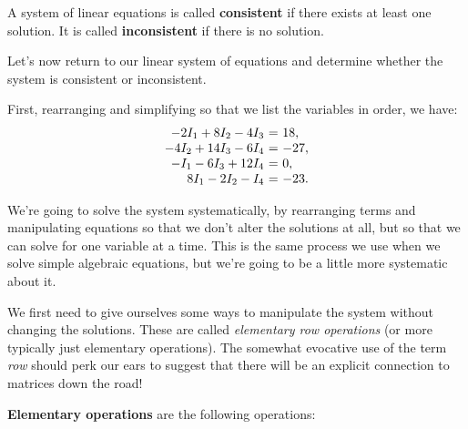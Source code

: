 \documentclass{ximera}
\begin{document}
\begin{example}
\begin{definition}
      A system of linear equations is called \textbf{consistent}%
       if there exists at
      least one solution. It is called \textbf{inconsistent}%
       if there is no
      solution.
    \end{definition}



\begin{solution}
  
  Let's now return to our linear system of equations and determine whether the system is consistent or inconsistent.

  First, rearranging and simplifying so that we list the variables in order, we have:
  \begin{equation*}
    \begin{array}{r@{~}c@{~}l}
      -2I_1+8I_2-4I_3&=&18, \\
      - 4I_2 + 14I_3 - 6I_4 &=& -27, \\
      -I_1 - 6I_3 + 12I_4 &=& 0, \\
      8I_1-2I_2 - I_4 &=& -23.
    \end{array}
  \end{equation*}

  We're going to solve the system systematically, by rearranging terms and manipulating equations so that we don't alter the solutions at all, but so that we can solve for one variable at a time. This is the same process we use when we solve simple algebraic equations, but we're going to be a little more systematic about it.

  \begin{remark}

  We first need to give ourselves some ways to manipulate the system without changing the solutions. These are called \emph{elementary row operations} (or more typically just elementary operations). The somewhat evocative use of the term \emph{row} should perk our ears to suggest that there will be an explicit connection to matrices down the road!

\end{remark}

  \begin{definition}
    
    \textbf{Elementary operations}%
     are the
    following operations:
  

\end{definition}
\end{solution}
\end{example}
\end{document}
